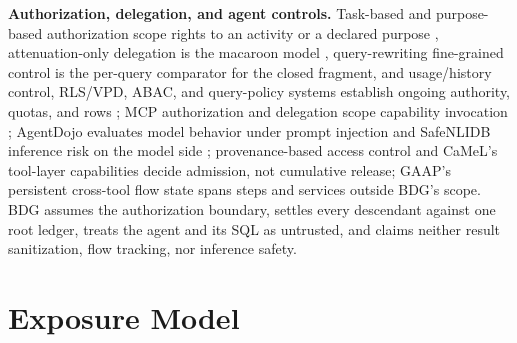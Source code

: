 \documentclass[10pt,journal,compsoc]{IEEEtran}
\begin{document}
\textbf{Authorization, delegation, and agent controls.} Task-based and
purpose-based authorization scope rights to an activity or a declared purpose
\cite{thomas1997tbac,byun2008purpose}, attenuation-only delegation is the
macaroon model \cite{birgisson2014macaroons}, query-rewriting fine-grained
control \cite{rizvi2004extending} is the per-query comparator for the closed
fragment, and usage/history control, RLS/VPD, ABAC, and query-policy systems
establish ongoing authority, quotas, and rows
\cite{park2004ucon,abadi2003history,li2003delegation,postgres16rls,hu2014abac,mehta2017qapla,zhang2022blockaid}; MCP authorization
and delegation scope capability invocation
\cite{mcp2025spec,south2025delegation}; AgentDojo evaluates
model behavior under prompt injection \cite{debenedetti2024agentdojo} and
SafeNLIDB inference risk on the model side \cite{liu2026safenlidb};
provenance-based access control \cite{park2012pbac} and CaMeL's tool-layer
capabilities \cite{debenedetti2025camel} decide admission, not cumulative
release; GAAP's persistent cross-tool flow state \cite{stanley2026gaap}
spans steps and services outside BDG's scope. BDG assumes the authorization boundary, settles every descendant
against one root ledger, treats the agent and its SQL as untrusted, and
claims neither result sanitization, flow tracking, nor inference safety.


\section{Exposure Model}
\label{sec:model}
\end{document}

